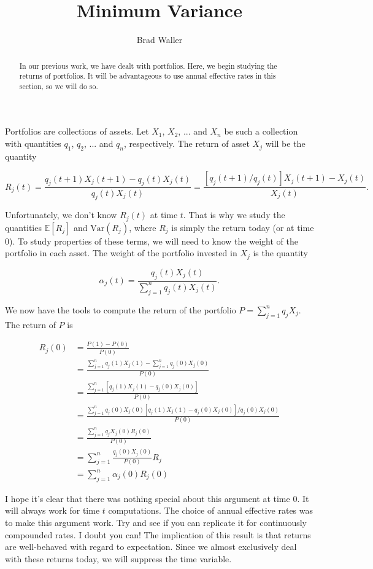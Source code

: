 \documentclass{ximera}
\author{Brad Waller}
\title{Minimum Variance}
\begin{document}
\begin{abstract}
In our previous work, we have dealt with portfolios. Here, we begin studying the returns of portfolios. It will be advantageous to use annual effective rates in this section, so we will do so.
\end{abstract}

\maketitle

Portfolios are collections of assets. Let $X_1$, $X_2$, ... and $X_n$ be such a collection with quantities $q_1$, $q_2$, ... and $q_n$, respectively. The return of asset $X_j$ will be the quantity

\begin{equation*}
R_j(t)=\frac{q_j(t+1)X_j(t+1)-q_j(t)X_j(t)}{q_j(t)X_j(t)}=\frac{[q_j(t+1)/q_j(t)]X_j(t+1)-X_j(t)}{X_j(t)}.
\end{equation*}

Unfortunately, we don't know $R_j(t)$ at time $t$. That is why we study the quantities $\mathbb{E}[R_j]$ and $\text{Var}(R_j)$, where $R_j$ is simply the return today (or at time $0$). To study properties of these terms, we will need to know the weight of the portfolio in each asset. The weight of the portfolio invested in $X_j$ is the quantity

\begin{equation*}
\alpha_j(t)=\frac{q_j(t)X_j(t)}{\sum_{j=1}^nq_j(t)X_j(t)}.
\end{equation*}

We now have the tools to compute the return of the portfolio $P=\sum_{j=1}^nq_jX_j$. The return of $P$ is

\begin{align*}
R_j(0) 	&=\frac{P(1)-P(0)}{P(0)}\\
		&=\frac{\sum_{j=1}^nq_j(1)X_j(1)-\sum_{j=1}^nq_j(0)X_j(0)}{P(0)}\\
		&=\frac{\sum_{j=1}^n[q_j(1)X_j(1)-q_j(0)X_j(0)]}{P(0)}\\
		&=\frac{\sum_{j=1}^nq_j(0)X_j(0)[q_j(1)X_j(1)-q_j(0)X_j(0)]/q_j(0)X_j(0)}{P(0)}\\
		&=\frac{\sum_{j=1}^nq_jX_j(0)R_j(0)}{P(0)}\\
		&=\sum_{j=1}^n\frac{q_j(0)X_j(0)}{P(0)}R_j\\
		&=\sum_{j=1}^n\alpha_j(0)R_j(0)
\end{align*}

I hope it's clear that there was nothing special about this argument at time $0$. It will always work for time $t$ computations. The choice of annual effective rates was to make this argument work. Try and see if you can replicate it for continuously compounded rates. I doubt you can! The implication of this result is that returns are well-behaved with regard to expectation. Since we almost exclusively deal with these returns today, we will suppress the time variable.
\end{document}
